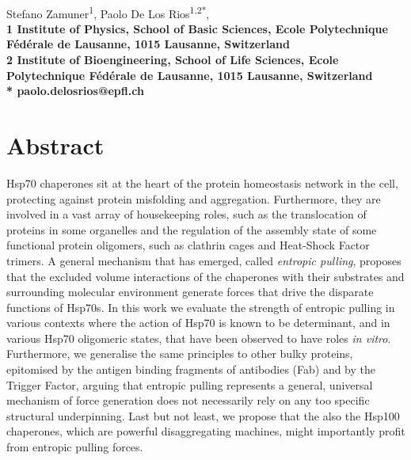 \documentclass[10pt,letterpaper]{article}
\begin{document}
\vspace*{0.35in}

\begin{flushleft}
{\Large
\textbf{}
}
\newline
\\
Stefano Zamuner\textsuperscript{1},
Paolo De Los Rios\textsuperscript{1,2*},
\\
\bigskip
\bf{1} Institute of Physics, School of Basic Sciences, Ecole Polytechnique F\'ed\'erale de Lausanne, 1015 Lausanne, Switzerland
\\
\bf{2} Institute of Bioengineering, School of Life Sciences, Ecole Polytechnique F\'ed\'erale de Lausanne, 1015 Lausanne, Switzerland
\\
\bigskip
* paolo.delosrios@epfl.ch

\end{flushleft}

\section*{Abstract}
Hsp70 chaperones sit at the heart of the protein homeostasis network in the cell, protecting  against protein misfolding and aggregation. Furthermore, they are involved in a vast array of housekeeping roles, such as the translocation of proteins in some organelles and the regulation of the assembly state of some functional protein oligomers, such as clathrin cages and Heat-Shock Factor trimers. A general mechanism that has emerged, called \textit{entropic pulling}, proposes that the excluded volume interactions of the chaperones with their substrates and surrounding molecular environment generate forces that drive
the disparate functions of Hsp70s. In this work we evaluate the strength of entropic pulling in various contexts where the action of Hsp70 is known to be determinant, and in various Hsp70 oligomeric states, that have been observed to have roles \textit{in vitro}.
Furthermore, we generalise the same principles to other bulky proteins, epitomised by the antigen binding fragments of antibodies (Fab) and by the Trigger Factor, arguing that entropic pulling represents a general, universal mechanism of force generation does not necessarily rely on any too specific structural underpinning. Last but not least, we propose that the also the Hsp100 chaperones, which are powerful disaggregating machines, might importantly profit from entropic pulling forces.
\linenumbers
\end{document}
